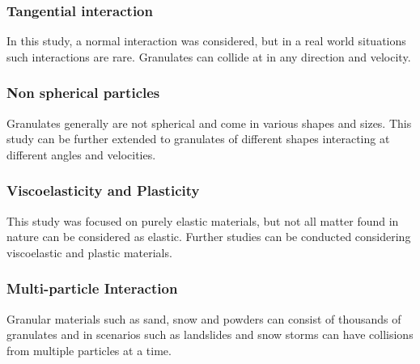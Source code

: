 \subsubsection*{Tangential interaction}

In this study, a normal interaction was considered, but in a real world situations such interactions are rare. Granulates can collide at in any direction and velocity.

\subsubsection*{Non spherical particles}

Granulates generally are not spherical and come in various shapes and sizes. This study can be further extended to granulates of different shapes interacting at different angles and velocities.

\subsubsection*{Viscoelasticity and Plasticity}

This study was focused on purely elastic materials, but not all matter found in nature can be considered as elastic. Further studies can be conducted considering viscoelastic and plastic materials.

\subsubsection*{Multi-particle Interaction}

Granular materials such as sand, snow and powders can consist of thousands of granulates and in scenarios such as landslides and snow storms can have collisions from multiple particles at a time.
